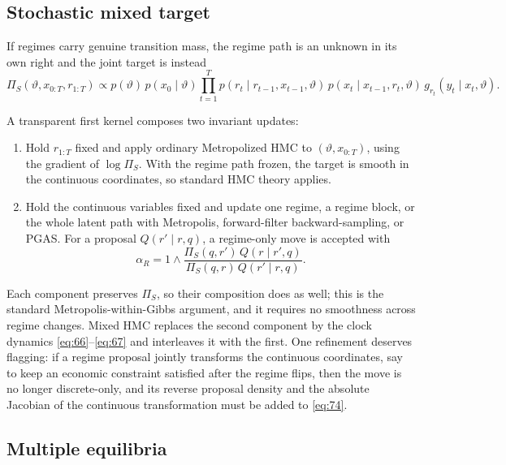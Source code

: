 \documentclass[11pt]{article}
\begin{document}
\subsection{Stochastic mixed target}\label{sec:target-stoch}

If regimes carry genuine transition mass, the regime path is an unknown in its
own right and the joint target is instead
\begin{equation}\label{eq:73}
 \Pi_S(\vartheta,x_{0:T},r_{1:T})\propto
 p(\vartheta)\,p(x_0\mid\vartheta)
 \prod_{t=1}^T p(r_t\mid r_{t-1},x_{t-1},\vartheta)\,
 p(x_t\mid x_{t-1},r_t,\vartheta)\,
 g_{r_t}(y_t\mid x_t,\vartheta).
\end{equation}

A transparent first kernel composes two invariant updates:
\begin{enumerate}
\item Hold $r_{1:T}$ fixed and apply ordinary Metropolized HMC to
      $(\vartheta,x_{0:T})$, using the gradient of $\log\Pi_S$. With the
      regime path frozen, the target is smooth in the continuous coordinates,
      so standard HMC theory applies.
\item Hold the continuous variables fixed and update one regime, a regime
      block, or the whole latent path with Metropolis, forward-filter
      backward-sampling, or PGAS. For a proposal $Q(r'\mid r,q)$, a
      regime-only move is accepted with
\begin{equation}\label{eq:74}
 \alpha_R=1\wedge
 \frac{\Pi_S(q,r')\,Q(r\mid r',q)}
      {\Pi_S(q,r)\,Q(r'\mid r,q)}.
\end{equation}
\end{enumerate}
Each component preserves $\Pi_S$, so their composition does as well; this is
the standard Metropolis-within-Gibbs argument, and it requires no smoothness
across regime changes. Mixed HMC replaces the second component by the clock
dynamics \eqref{eq:66}--\eqref{eq:67} and interleaves it with the first. One
refinement deserves flagging: if a regime proposal jointly transforms the
continuous coordinates, say to keep an economic constraint satisfied after
the regime flips, then the move is no longer discrete-only, and its reverse
proposal density and the absolute Jacobian of the continuous transformation
must be added to \eqref{eq:74}.

\subsection{Multiple equilibria}\label{sec:target-multi}
\end{document}
